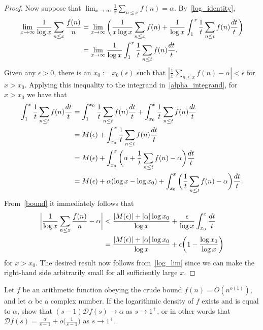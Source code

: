 \documentclass[11pt]{article}
\newenvironment{ex}[1]
  {\renewcommand\theinnercustomthm{#1}\innercustomthm}
  {\endinnercustomthm}
\begin{document}
\begin{proof}
Now suppose that $\lim_{x\to\infty}\frac{1}{x}\sum_{n\leq x}f(n) = \alpha$. By~\eqref{log_identity},
\begin{align}
\lim_{x\to\infty}\frac{1}{\log{x}}\sum_{n\leq x}\frac{f(n)}{n} &= \lim_{x\to\infty}\bigg(\frac{1}{x\log{x}}\sum_{n\leq x}f(n)+\frac{1}{\log{x}}\int_1^x\frac{1}{t}\sum_{n\leq t}f(n)\frac{dt}{t}\bigg)\notag\\
&= \lim_{x\to\infty}\frac{1}{\log{x}}\int_1^x\frac{1}{t}\sum_{n\leq t}f(n)\frac{dt}{t}.\label{alpha_integrand}
\end{align}
Given any $\epsilon >0$, there is an $x_0:=x_0(\epsilon)$ such that $|\frac{1}{x}\sum_{n\leq x}f(n)-\alpha|<\epsilon$ for $x>x_0$. Applying this inequality to the integrand in~\eqref{alpha_integrand}, for $x>x_0$ we have that
\begin{align}
\int_1^x\frac{1}{t}\sum_{n\leq t}f(n)\frac{dt}{t} &= \int_1^{x_0}\frac{1}{t}\sum_{n\leq t}f(n)\frac{dt}{t}+\int_{x_0}^x\frac{1}{t}\sum_{n\leq t}f(n)\frac{dt}{t}\notag\\
&= M(\epsilon)+\int_{x_0}^x\frac{1}{t}\sum_{n\leq t}f(n)\frac{dt}{t}\notag\\
&= M(\epsilon)+\int_{x_0}^x\bigg(\alpha+\frac{1}{t}\sum_{n\leq t}f(n)-\alpha\bigg)\frac{dt}{t}\notag\\
&= M(\epsilon)+\alpha(\log{x}-\log{x_0})+\int_{x_0}^x\bigg(\frac{1}{t}\sum_{n\leq t}f(n)-\alpha\bigg)\frac{dt}{t}.\label{bound}
\end{align}
From~\eqref{bound} it immediately follows that
\begin{align}
\bigg|\frac{1}{\log{x}}\sum_{n\leq x}\frac{f(n)}{n}-\alpha\bigg| &< \frac{|M(\epsilon)|+|\alpha|\log{x_0}}{\log{x}}+\frac{\epsilon}{\log{x}}\int_{x_0}^x\frac{dt}{t}\notag\\
&= \frac{|M(\epsilon)|+|\alpha|\log{x_0}}{\log{x}}+\epsilon\bigg(1-\frac{\log{x_0}}{\log{x}}\bigg)\label{log_lim}
\end{align}
for $x>x_0$. The desired result now follows from~\eqref{log_lim} since we can make the right-hand side arbitrarily small for all sufficiently large $x$.
\end{proof}


\begin{ex}{8}\label{eight}
Let $f$ be an arithmetic function obeying the crude bound $f(n) = O(n^{o(1)})$, and let $\alpha$ be a complex number. If the logarithmic density of $f$ exists and is equal to $\alpha$, show that $(s-1)\mathcal{D}f(s)\to\alpha$ as $s\to 1^+$, or in other words that $\mathcal{D}f(s)=\frac{\alpha}{s-1}+o\big(\frac{1}{s-1}\big)$ as $s\to 1^+$.
\end{ex}
\end{document}
